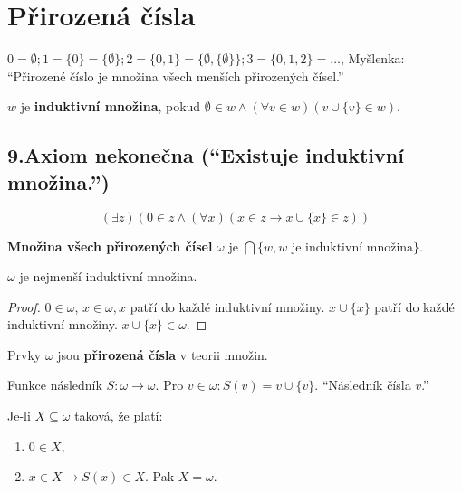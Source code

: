 \chapter{Přirozená čísla}

\begin{definice}
	$0 = \emptyset; 1 = \{0\} = \{\emptyset\}; 2 = \{0,1\} = \{\emptyset, \{\emptyset \}\}; 3 = \{0,1,2\} = \dots$, Myšlenka: “Přirozené číslo je množina všech menších přirozených čísel.”
\end{definice}

\begin{definice}
	$w$ je \textbf{induktivní množina}, pokud $\emptyset \in w \land (\forall v \in w)(v \cup \{v\} \in w)$.
\end{definice}

\section{9.Axiom nekonečna (“Existuje induktivní množina.”)}

$$
(\exists z)(0 \in z \land (\forall x)(x \in z \rightarrow x \cup \{x\} \in z))
$$

\begin{definice}
	\textbf{Množina všech přirozených čísel} $\omega$ je $\bigcap\{w, w \text{ je induktivní množina}\}$.
\end{definice}

\begin{lemma}
	$\omega$ je nejmenší induktivní množina.
\end{lemma}

\begin{proof}
	$0 \in \omega$, $x \in \omega, x$ patří do každé induktivní množiny. $x \cup \{x\}$ patří do každé induktivní množiny. $x \cup \{x\} \in \omega$.
\end{proof}

Prvky $\omega$ jsou \textbf{přirozená čísla} v teorii množin.

\begin{definice}
	Funkce následník $S: \omega\to\omega$. Pro $v \in \omega: S(v) = v \cup \{v\}$. “Následník čísla $v$.”
\end{definice}

\begin{thm}
	Je-li $X \subseteq \omega$ taková, že platí:
	
	\begin{enumerate}
		\item $0 \in X$,
		\item $x \in X \rightarrow S(x) \in X$. Pak $X = \omega$.
	\end{enumerate}
\end{thm}

